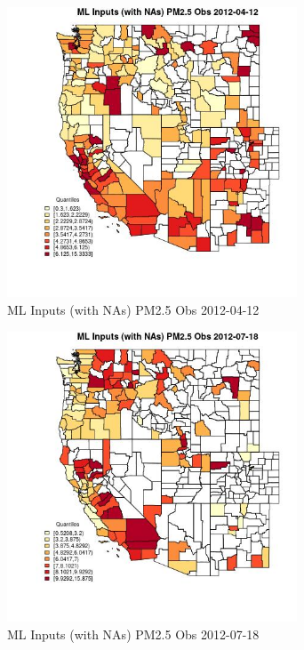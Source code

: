 \clearpage 

\begin{figure} 
\centering  
\includegraphics[width=0.77\textwidth]{Code_Outputs/Report_ML_input_PM25_Step4_part_e_de_duplicated_aves_compiled_2019-05-14wNAs_CountyPM25_ObsMean2012-04-12_2012-04-12.jpg} 
\caption{\label{fig:Report_ML_input_PM25_Step4_part_e_de_duplicated_aves_compiled_2019-05-14wNAsCountyPM25_ObsMean2012-04-12_2012-04-12}ML Inputs (with NAs) PM2.5 Obs 2012-04-12} 
\end{figure} 
 

\begin{figure} 
\centering  
\includegraphics[width=0.77\textwidth]{Code_Outputs/Report_ML_input_PM25_Step4_part_e_de_duplicated_aves_compiled_2019-05-14wNAs_CountyPM25_ObsMean2012-07-18_2012-07-18.jpg} 
\caption{\label{fig:Report_ML_input_PM25_Step4_part_e_de_duplicated_aves_compiled_2019-05-14wNAsCountyPM25_ObsMean2012-07-18_2012-07-18}ML Inputs (with NAs) PM2.5 Obs 2012-07-18} 
\end{figure} 
 

